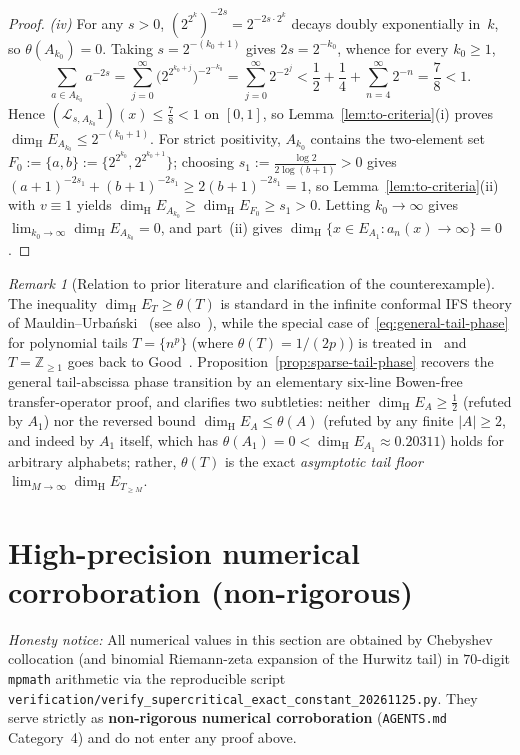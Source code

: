 \documentclass[11pt]{article}
\theoremstyle{definition}
\theoremstyle{remark}
\newtheorem{remark}[theorem]{Remark}
\newcommand{\Z}{\mathbb{Z}}
\newcommand{\dimH}{\dim_{\mathrm{H}}}
\begin{document}
\begin{proof}
\emph{(iv)} For any $s>0$, $(2^{2^k})^{-2s}=2^{-2s\cdot 2^k}$ decays doubly
exponentially in~$k$, so $\theta(A_{k_0})=0$. Taking $s=2^{-(k_0+1)}$ gives
$2s=2^{-k_0}$, whence for every $k_0\ge1$,
\[
\sum_{a\in A_{k_0}}a^{-2s}
=\sum_{j=0}^\infty \bigl(2^{2^{k_0+j}}\bigr)^{-2^{-k_0}}
=\sum_{j=0}^\infty 2^{-2^j}
<\frac12+\frac14+\sum_{n=4}^\infty 2^{-n}
=\frac78<1.
\]
Hence $(\mathcal L_{s,A_{k_0}}1)(x)\le\frac78<1$ on $[0,1]$, so
Lemma~\ref{lem:to-criteria}(i) proves $\dimH E_{A_{k_0}}\le 2^{-(k_0+1)}$.
For strict positivity, $A_{k_0}$ contains the two-element set
$F_0:=\{a,b\}:=\{2^{2^{k_0}},2^{2^{k_0+1}}\}$; choosing
$s_1:=\frac{\log 2}{2\log(b+1)}>0$ gives
$(a+1)^{-2s_1}+(b+1)^{-2s_1}\ge 2(b+1)^{-2s_1}=1$, so
Lemma~\ref{lem:to-criteria}(ii) with $v\equiv1$ yields
$\dimH E_{A_{k_0}}\ge\dimH E_{F_0}\ge s_1>0$. Letting $k_0\to\infty$ gives
$\lim_{k_0\to\infty}\dimH E_{A_{k_0}}=0$, and part~(ii) gives
$\dimH\{x\in E_{A_1}:a_n(x)\to\infty\}=0$.
\end{proof}

\begin{remark}[Relation to prior literature and clarification of the counterexample]\label{rem:sparse-prior}
The inequality $\dimH E_T\ge\theta(T)$ is standard in the infinite conformal
IFS theory of Mauldin--Urba\'nski~\cite{MU96} (see also~\cite{CLU}), while
the special case of~\eqref{eq:general-tail-phase} for polynomial tails
$T=\{n^p\}$ (where $\theta(T)=1/(2p)$) is treated in~\cite[Proposition~9.3]{DFSU}
and $T=\Z_{\ge1}$ goes back to Good~\cite{Good41}. Proposition~\ref{prop:sparse-tail-phase}
recovers the general tail-abscissa phase transition by an elementary six-line
Bowen-free transfer-operator proof, and clarifies two subtleties: neither
$\dimH E_A\ge\frac12$ (refuted by $A_1$) nor the reversed bound
$\dimH E_A\le\theta(A)$ (refuted by any finite $|A|\ge2$, and indeed by
$A_1$ itself, which has $\theta(A_1)=0<\dimH E_{A_1}\approx 0.20311$) holds
for arbitrary alphabets; rather, $\theta(T)$ is the exact \emph{asymptotic
tail floor} $\lim_{M\to\infty}\dimH E_{T_{\ge M}}$.
\end{remark}

\section{High-precision numerical corroboration (non-rigorous)}\label{sec:numerics}

\emph{Honesty notice:} All numerical values in this section are obtained by
Chebyshev collocation (and binomial Riemann-zeta expansion of the Hurwitz
tail) in $70$-digit \texttt{mpmath} arithmetic via the reproducible script
\texttt{verification/\allowbreak verify\_\allowbreak supercritical\_\allowbreak exact\_\allowbreak constant\_\allowbreak 20261125.py}.
They serve strictly as \textbf{non-rigorous numerical corroboration}
(\texttt{AGENTS.md} Category~4) and do not enter any proof above.
\end{document}
